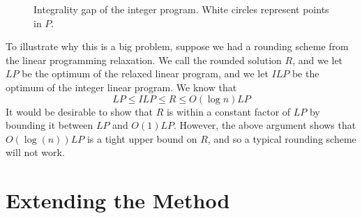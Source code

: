 \documentclass[11pt]{article}
\begin{document}
\begin{figure}
\centering
{}
\caption{Integrality gap of the integer program. White circles represent points in $P$.}
\label{fig:integralitygap}
\end{figure}

To illustrate why this is a big problem, suppose we had a rounding scheme from the linear programming relaxation. We call the rounded solution $R$, and we let $LP$ be the optimum of the relaxed linear program, and we let $ILP$ be the optimum of the integer linear program. We know that
\[ LP \leq ILP \leq R \leq O(\log n)LP \]
It would be desirable to show that $R$ is within a constant factor of $LP$ by bounding it between $LP$ and $O(1)LP$. However, the above argument shows that $O(\log(n))LP$ is a tight upper bound on $R$, and so a typical rounding scheme will not work.

\section{Extending the Method}
\end{document}
